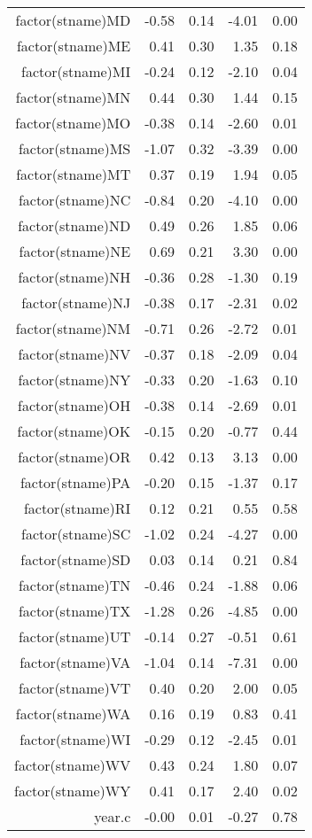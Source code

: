 \begin{table}[ht]
\begin{tabular}{rrrrr}
  factor(stname)MD & -0.58 & 0.14 & -4.01 & 0.00 \\ 
  factor(stname)ME & 0.41 & 0.30 & 1.35 & 0.18 \\ 
  factor(stname)MI & -0.24 & 0.12 & -2.10 & 0.04 \\ 
  factor(stname)MN & 0.44 & 0.30 & 1.44 & 0.15 \\ 
  factor(stname)MO & -0.38 & 0.14 & -2.60 & 0.01 \\ 
  factor(stname)MS & -1.07 & 0.32 & -3.39 & 0.00 \\ 
  factor(stname)MT & 0.37 & 0.19 & 1.94 & 0.05 \\ 
  factor(stname)NC & -0.84 & 0.20 & -4.10 & 0.00 \\ 
  factor(stname)ND & 0.49 & 0.26 & 1.85 & 0.06 \\ 
  factor(stname)NE & 0.69 & 0.21 & 3.30 & 0.00 \\ 
  factor(stname)NH & -0.36 & 0.28 & -1.30 & 0.19 \\ 
  factor(stname)NJ & -0.38 & 0.17 & -2.31 & 0.02 \\ 
  factor(stname)NM & -0.71 & 0.26 & -2.72 & 0.01 \\ 
  factor(stname)NV & -0.37 & 0.18 & -2.09 & 0.04 \\ 
  factor(stname)NY & -0.33 & 0.20 & -1.63 & 0.10 \\ 
  factor(stname)OH & -0.38 & 0.14 & -2.69 & 0.01 \\ 
  factor(stname)OK & -0.15 & 0.20 & -0.77 & 0.44 \\ 
  factor(stname)OR & 0.42 & 0.13 & 3.13 & 0.00 \\ 
  factor(stname)PA & -0.20 & 0.15 & -1.37 & 0.17 \\ 
  factor(stname)RI & 0.12 & 0.21 & 0.55 & 0.58 \\ 
  factor(stname)SC & -1.02 & 0.24 & -4.27 & 0.00 \\ 
  factor(stname)SD & 0.03 & 0.14 & 0.21 & 0.84 \\ 
  factor(stname)TN & -0.46 & 0.24 & -1.88 & 0.06 \\ 
  factor(stname)TX & -1.28 & 0.26 & -4.85 & 0.00 \\ 
  factor(stname)UT & -0.14 & 0.27 & -0.51 & 0.61 \\ 
  factor(stname)VA & -1.04 & 0.14 & -7.31 & 0.00 \\ 
  factor(stname)VT & 0.40 & 0.20 & 2.00 & 0.05 \\ 
  factor(stname)WA & 0.16 & 0.19 & 0.83 & 0.41 \\ 
  factor(stname)WI & -0.29 & 0.12 & -2.45 & 0.01 \\ 
  factor(stname)WV & 0.43 & 0.24 & 1.80 & 0.07 \\ 
  factor(stname)WY & 0.41 & 0.17 & 2.40 & 0.02 \\ 
  year.c & -0.00 & 0.01 & -0.27 & 0.78 \\ 
   \hline
\end{tabular}
\end{table}
